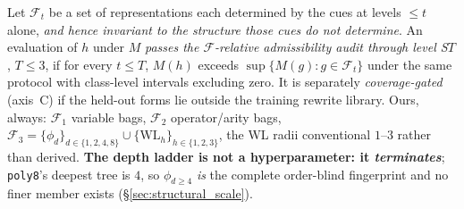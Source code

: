 %
\begin{definition}
\label{def:audit_complete}
Let $\mathcal{F}_t$ be a set of representations each determined by the cues at levels ${\leq}t$ alone, \emph{and hence invariant to the structure those cues do not determine}. An evaluation of $h$ under $M$ \emph{passes the $\mathcal{F}$-relative admissibility audit through level S$T$}, $T\leq3$, if for every $t\leq T$, $M(h)$ exceeds $\sup\{M(g) : g\in\mathcal{F}_t\}$ under the same protocol with class-level intervals excluding zero. It is separately \emph{coverage-gated} (axis~C) if the held-out forms lie outside the training rewrite library. Ours, always: $\mathcal{F}_1$ variable bags, $\mathcal{F}_2$ operator/arity bags, $\mathcal{F}_3 = \{\phi_d\}_{d\in\{1,2,4,8\}} \cup \{\mathrm{WL}_h\}_{h\in\{1,2,3\}}$, the WL radii conventional $1$--$3$ rather than derived. \textbf{The depth ladder is not a hyperparameter: it \emph{terminates}}; \texttt{poly8}'s deepest tree is $4$, so $\phi_{d\geq4}$ \emph{is} the complete order-blind fingerprint and no finer member exists (\S\ref{sec:structural_scale}).
\end{definition}

